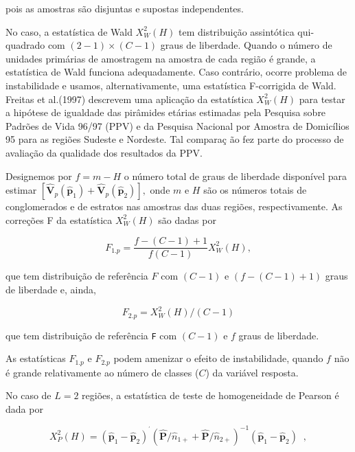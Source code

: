 \documentclass[]{book}
\theoremstyle{definition}
\theoremstyle{definition}
\theoremstyle{definition}
\theoremstyle{remark}
\begin{document}
pois as amostras são disjuntas e supostas independentes.

No caso, a estatística de Wald \(X_{W}^{2}\left( H\right)\) tem
distribuição assintótica qui-quadrado com
\(\left( 2-1\right) \times \left( C-1\right)\) graus de liberdade.
Quando o número de unidades primárias de amostragem na amostra de cada
região é grande, a estatística de Wald funciona adequadamente. Caso
contrário, ocorre problema de instabilidade e usamos, alternativamente,
uma estatística F-corrigida de Wald. Freitas et al.(1997) descrevem uma
aplicação da estatística \(X_{W}^{2}\left( H\right)\) para testar a
hipótese de igualdade das pirâmides etárias estimadas pela Pesquisa
sobre Padrões de Vida 96/97 (PPV) e da Pesquisa Nacional por Amostra de
Domicílios 95 para as regiões Sudeste e Nordeste. Tal compara\c{c
}ão fez parte do processo de avaliação da qualidade dos resultados da
PPV.

Designemos por \(f=m-H\) o número total de graus de liberdade disponível
para estimar
\(\left[ \mathbf{\hat{V}}_{p}\left( \widehat{ \mathbf{p}}_{1}\right) +\mathbf{\hat{V}}_{p}\left( \widehat{\mathbf{p}} _{2}\right) \right] ,\)
onde \(m\) e \(H\) são os números totais de conglomerados e de estratos
nas amostras das duas regiões, respectivamente. As correções F da
estatística \(X_{W}^{2}\left( H\right)\) são dadas por

\begin{equation}
F_{1.p}=\frac{f-\left( C-1\right) +1}{f\left( C-1\right) }X_{W}^{2}\left(
H\right) , \label{eq:Tab2} 
\end{equation}

que tem distribuição de referência \(F\) com \(\left(C-1\right)\) e
\(\left( f-\left( C-1\right)+1\right)\) graus de liberdade e, ainda,

\begin{equation}
F_{2.p}=X_{W}^{2}\left( H\right) /\left(C-1\right) \label{eq:Tab3}
\end{equation}

que tem distribuição de referência \texttt{F} com \(\left(C-1\right)\) e
\(f\) graus de liberdade.

As estatísticas \(F_{1.p}\) e \(F_{2.p}\) podem amenizar o efeito de
instabilidade, quando \(f\) não é grande relativamente ao número de
classes (\(C\)) da variável resposta.

No caso de \(L=2\) regiões, a estatística de teste de homogeneidade de
Pearson é dada por

\begin{equation}
X_{P}^{2}\left( H\right) =\left( \mathbf{\hat{p}}_{1}-\mathbf{\hat{p}}
_{2}\right) ^{^{\prime }}\left( \mathbf{\hat{P}}/\widehat{n}_{1+}+\mathbf{
\hat{P}}/\widehat{n}_{2+}\right) ^{-1}\left( \mathbf{\hat{p}}_{1}-\mathbf{
\hat{p}}_{2}\right) \;\;,  \label{eq:Tab4}
\end{equation}
\end{document}

